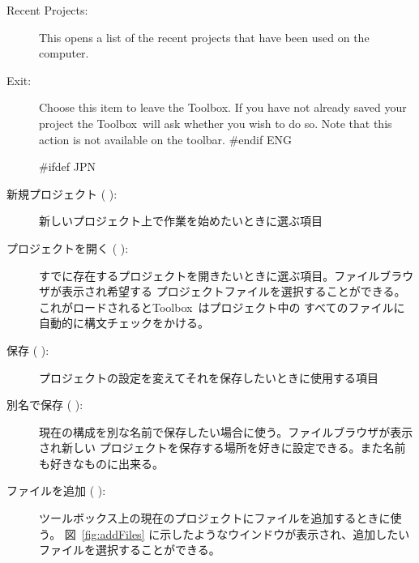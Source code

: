 \documentclass[\pformat,12pt]{article}
\newcommand{\Toolbox}{Toolbox}
\newcommand{\Toolbox}{Toolbox}
\newcommand{\guicmd}[1]{{\sf #1}}
\newcommand{\guicmd}[1]{{\gt #1}}
\begin{document}
\begin{description}
\item[\guicmd{Recent Projects}:]
  This opens a list of the recent projects that have been used on the
  computer.

\item[\guicmd{Exit}:] Choose this item to leave the \Toolbox. If you
  have not already saved your project the \Toolbox\ will ask whether
  you wish to do so. Note that this action is not available on the
  toolbar. 
#endif ENG

#ifdef JPN
\item[\guicmd{新規プロジェクト} (\hspace{-1.8mm}
):]
  新しいプロジェクト上で作業を始めたいときに選ぶ項目

\item[\guicmd{プロジェクトを開く} (\hspace{-1.2mm}
\hspace{.6mm}):]
  すでに存在するプロジェクトを開きたいときに選ぶ項目。ファイルブラウザが表示され希望する
  プロジェクトファイルを選択することができる。これがロードされると\Toolbox\ はプロジェクト中の
  すべてのファイルに自動的に構文チェックをかける。

\item[\guicmd{保存} (\hspace{-1.8mm}
):]
  プロジェクトの設定を変えてそれを保存したいときに使用する項目

\item[\guicmd{別名で保存} (\hspace{-1.5mm}
):]
  現在の構成を別な名前で保存したい場合に使う。ファイルブラウザが表示され新しい
  プロジェクトを保存する場所を好きに設定できる。また名前も好きなものに出来る。

\item[\guicmd{ファイルを追加} (\hspace{-1.5mm}
):] 
  ツールボックス上の現在のプロジェクトにファイルを追加するときに使う。
  図~\ref{fig:addFiles} に示したようなウインドウが表示され、追加したいファイルを選択することができる。


\end{description}
\end{document}
